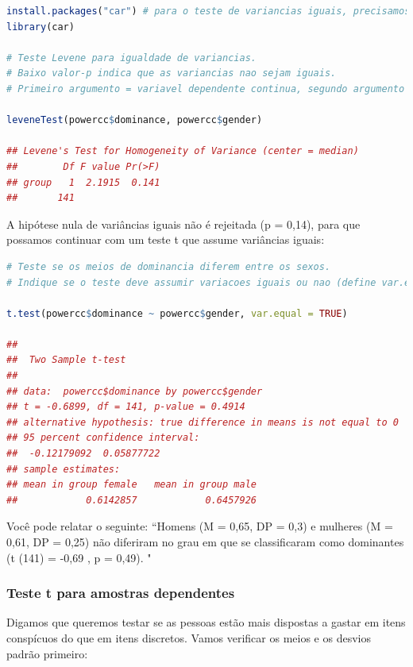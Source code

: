\documentclass{article}
\begin{document}
\begin{lstlisting}[language=R]
install.packages("car") # para o teste de variancias iguais, precisamos de um pacote chamado car
library(car)

# Teste Levene para igualdade de variancias.
# Baixo valor-p indica que as variancias nao sejam iguais.
# Primeiro argumento = variavel dependente continua, segundo argumento = variavel independente categorica

leveneTest(powercc$dominance, powercc$gender) 

## Levene's Test for Homogeneity of Variance (center = median)
##        Df F value Pr(>F)
## group   1  2.1915  0.141
##       141

\end{lstlisting}

\newpage
A hipótese nula de variâncias iguais não é rejeitada (p = 0,14), para que possamos continuar com um teste t que assume variâncias iguais:

\begin{lstlisting}[language=R]
# Teste se os meios de dominancia diferem entre os sexos.
# Indique se o teste deve assumir variacoes iguais ou nao (define var.equal = FALSE para um teste que nao assume variacoes iguais).

t.test(powercc$dominance ~ powercc$gender, var.equal = TRUE) 

## 
##  Two Sample t-test
## 
## data:  powercc$dominance by powercc$gender
## t = -0.6899, df = 141, p-value = 0.4914
## alternative hypothesis: true difference in means is not equal to 0
## 95 percent confidence interval:
##  -0.12179092  0.05877722
## sample estimates:
## mean in group female   mean in group male 
##            0.6142857            0.6457926

\end{lstlisting}


Você pode relatar o seguinte: “Homens (M = 0,65, DP = 0,3) e mulheres (M = 0,61, DP = 0,25) não diferiram no grau em que se classificaram como dominantes (t (141) = -0,69 , p = 0,49). "

\subsubsection{Teste t para amostras dependentes}

Digamos que queremos testar se as pessoas estão mais dispostas a gastar em itens conspícuos do que em itens discretos. Vamos verificar os meios e os desvios padrão primeiro:
\end{document}
